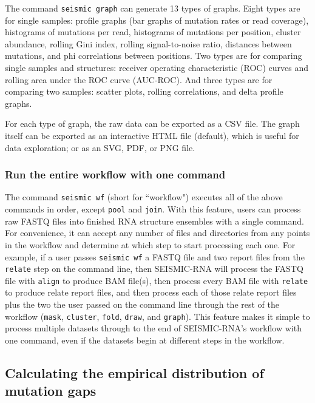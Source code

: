 \documentclass[11pt]{article}
\begin{document}
The command \verb|seismic graph| can generate 13 types of graphs.
Eight types are for single samples: profile graphs (bar graphs of mutation rates or read coverage), histograms of mutations per read, histograms of mutations per position, cluster abundance, rolling Gini index, rolling signal-to-noise ratio, distances between mutations, and phi correlations between positions.
Two types are for comparing single samples and structures: receiver operating characteristic (ROC) curves and rolling area under the ROC curve (AUC-ROC).
And three types are for comparing two samples: scatter plots, rolling correlations, and delta profile graphs.

For each type of graph, the raw data can be exported as a CSV file.
The graph itself can be exported as an interactive HTML file (default), which is useful for data exploration; or as an SVG, PDF, or PNG file.

\subsubsection{Run the entire workflow with one command}

The command \verb|seismic wf| (short for ``workflow") executes all of the above commands in order, except \verb|pool| and \verb|join|.
With this feature, users can process raw FASTQ files into finished RNA structure ensembles with a single command.
For convenience, it can accept any number of files and directories from any points in the workflow and determine at which step to start processing each one.
For example, if a user passes \verb|seismic wf| a FASTQ file and two report files from the \verb|relate| step on the command line, then SEISMIC-RNA will process the FASTQ file with \verb|align| to produce BAM file(s), then process every BAM file with \verb|relate| to produce relate report files, and then process each of those relate report files plus the two the user passed on the command line through the rest of the workflow (\verb|mask|, \verb|cluster|, \verb|fold|, \verb|draw|, and \verb|graph|).
This feature makes it simple to process multiple datasets through to the end of SEISMIC-RNA's workflow with one command, even if the datasets begin at different steps in the workflow.


\subsection{Calculating the empirical distribution of mutation gaps}
\label{empirical-mutation-gap}
\end{document}
